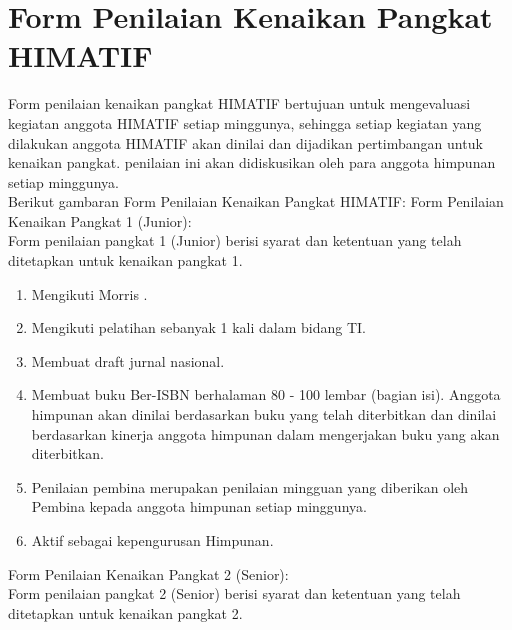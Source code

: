 \chapter{Form Penilaian Kenaikan Pangkat HIMATIF}
\par
Form penilaian kenaikan pangkat HIMATIF bertujuan untuk mengevaluasi kegiatan anggota HIMATIF setiap minggunya, sehingga setiap kegiatan yang dilakukan anggota HIMATIF akan dinilai dan dijadikan pertimbangan untuk kenaikan pangkat. penilaian ini akan didiskusikan oleh para anggota himpunan setiap minggunya.\\
Berikut gambaran Form Penilaian Kenaikan Pangkat HIMATIF:
Form Penilaian Kenaikan Pangkat 1 (Junior):\\
Form penilaian pangkat 1 (Junior) berisi syarat dan ketentuan yang telah ditetapkan untuk kenaikan pangkat 1.\\
\begin{enumerate}
 \item Mengikuti Morris .
 \item Mengikuti pelatihan sebanyak 1 kali dalam bidang TI.
 \item Membuat draft jurnal nasional.
 \item Membuat buku Ber-ISBN berhalaman 80 - 100 lembar (bagian isi). Anggota himpunan akan dinilai berdasarkan buku yang telah diterbitkan dan dinilai berdasarkan kinerja anggota himpunan dalam mengerjakan buku yang akan diterbitkan.
 \item Penilaian pembina merupakan penilaian mingguan yang diberikan oleh Pembina kepada anggota himpunan setiap minggunya.
 \item Aktif sebagai kepengurusan Himpunan.
 
\end{enumerate}
Form Penilaian Kenaikan Pangkat 2 (Senior):\\
Form penilaian pangkat 2 (Senior) berisi syarat dan ketentuan yang telah ditetapkan untuk kenaikan pangkat 2.\\
